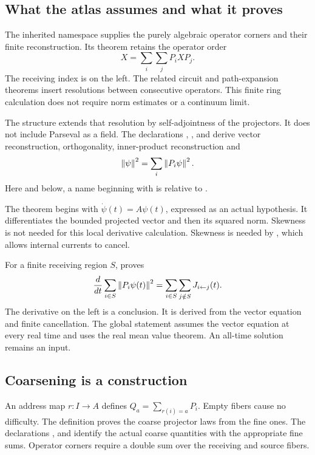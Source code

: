 \subsection{What the atlas assumes and what it proves}

The inherited namespace  supplies the purely algebraic operator corners and their finite reconstruction. Its  theorem retains the operator order
\[
 X=\sum_i\sum_j P_iXP_j.
\]
The receiving index is on the left. The related circuit and path-expansion theorems insert resolutions between consecutive operators. This finite ring calculation does not require norm estimates or a continuum limit.

The structure  extends that resolution by self-adjointness of the projectors. It does not include Parseval as a field. The declarations , ,  and  derive vector reconstruction, orthogonality, inner-product reconstruction and
\[
 \left\lVert\psi\right\rVert^2=\sum_i\left\lVert P_i\psi\right\rVert^2.
\]
Here and below, a name beginning with  is relative to .

The theorem  begins with
\(\dot\psi(t)=A\psi(t)\), expressed as an actual  hypothesis. It differentiates the bounded projected vector and then its squared norm. Skewness is not needed for this local derivative calculation. Skewness is needed by , which allows internal currents to cancel.

For a finite receiving region \(S\),  proves
\[
 \frac{d}{dt}\sum_{i\in S}\left\lVert P_i\psi(t)\right\rVert^2
 =\sum_{i\in S}\sum_{j\notin S}J_{i\leftarrow j}(t).
\]
The derivative on the left is a conclusion. It is derived from the vector equation and finite cancellation. The global statement  assumes the vector equation at every real time and uses the real mean value theorem. An all-time solution remains an input.

\subsection{Coarsening is a construction}

An address map \(r:I\to A\) defines \(Q_a=\sum_{r(i)=a}P_i\). Empty fibers cause no difficulty. The definition  proves the coarse projector laws from the fine ones. The declarations ,  and  identify the actual coarse quantities with the appropriate fine sums. Operator corners require a double sum over the receiving and source fibers.

